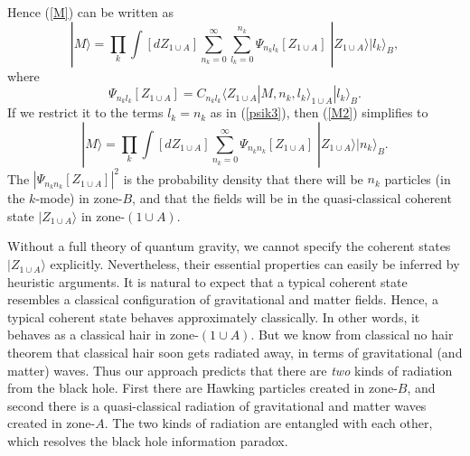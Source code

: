 \documentclass[aps,prd,onecolumn,groupedaddress,showkeys,12pt]{revtex4-2}
\begin{document}
Hence (\ref{M}) can be written as 
\begin{equation}\label{M2}
 |M\rangle = \prod_k \int [dZ_{1\cup A}] \sum_{n_k=0}^{\infty} \sum_{l_k=0}^{n_k} 
\Psi_{n_kl_k}[Z_{1\cup A}] \;  |Z_{1\cup A}\rangle |l_k\rangle_B ,
\end{equation}
where
\begin{equation}
\Psi_{n_kl_k}[Z_{1\cup A}]=C_{n_kl_k} \langle Z_{1\cup A}|M,n_k,l_k\rangle_{1\cup A} |l_k\rangle_B .
\end{equation}
If we restrict it to the terms $l_k=n_k$ as in (\ref{psik3}), then (\ref{M2}) simplifies to
\begin{equation}\label{M3}
 |M\rangle = \prod_k \int [dZ_{1\cup A}] \sum_{n_k=0}^{\infty}  
\Psi_{n_kn_k}[Z_{1\cup A}] \;  |Z_{1\cup A}\rangle |n_k\rangle_B .
\end{equation}
The $|\Psi_{n_kn_k}[Z_{1\cup A}]|^2$ is the probability density that there will be $n_k$ particles (in the $k$-mode)
in zone-$B$, and that the fields will be in the quasi-classical coherent state $|Z_{1\cup A}\rangle$
in zone-$(1\!\cup\!A)$.  

Without a full theory of quantum gravity, we cannot specify the coherent states $|Z_{1\cup A}\rangle$ explicitly.
Nevertheless, their essential properties can easily be inferred by heuristic arguments. It is natural to expect that 
a typical coherent state resembles a classical configuration of gravitational and matter fields. 
Hence, a typical coherent state behaves approximately classically. 
In other words, it behaves as a classical hair in zone-$(1\!\cup\!A)$. But we know from  
classical no hair theorem \cite{hawking-ellis,frolov-novikov} that classical hair soon gets radiated away, in terms 
of gravitational (and matter) waves. Thus our approach predicts that there are {\em two} kinds of radiation
from the black hole. First there are Hawking particles created in zone-$B$, and second there is a
quasi-classical radiation of gravitational and matter waves created in zone-$A$. 
The two kinds of radiation are entangled with each other, which resolves the black hole information paradox.
 
\end{document}
